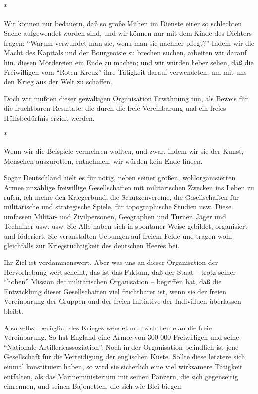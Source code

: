 \documentclass{scrbook}
\begin{document}
\begin{center}*\end{center}

Wir können nur bedauern, daß so große Mühen im Dienste einer so schlechten Sache aufgewendet worden sind, und wir können nur mit dem Kinde des Dichters fragen: ``Warum verwundet man sie, wenn man sie nachher pflegt?'' Indem wir die Macht des Kapitals und der Bourgeoisie zu brechen suchen, arbeiten wir darauf hin, diesen Mördereien ein Ende zu machen; und wir würden lieber sehen, daß die Freiwilligen vom ``Roten Kreuz'' ihre Tätigkeit darauf verwendeten, um mit uns den Krieg aus der Welt zu schaffen.

Doch wir mußten dieser gewaltigen Organisation Erwähnung tun, als Beweis für die fruchtbaren Resultate, die durch die freie Vereinbarung und ein freies Hülfsbedürfnis erzielt werden.

\begin{center}*\end{center}

Wenn wir die Beispiele vermehren wollten, und zwar, indem wir sie der Kunst, Menschen auszurotten, entnehmen, wir würden kein Ende finden.

Sogar Deutschland hielt es für nötig, neben seiner großen, wohlorganisierten Armee unzählige freiwillige Gesellschaften mit militärischen Zwecken ins Leben zu rufen, ich meine den Kriegerbund, die Schützenvereine, die Gesellschaften für militärische und strategische Spiele, für topographische Studien usw. Diese umfassen Militär- und Zivilpersonen, Geographen und Turner, Jäger und Techniker usw. usw. Sie Alle haben sich in spontaner Weise gebildet, organisiert und föderiert. Sie veranstalten Uebungen auf freiem Felde und tragen wohl gleichfalls zur Kriegstüchtigkeit des deutschen Heeres bei.

Ihr Ziel ist verdammenswert. Aber was uns an dieser Organisation der Hervorhebung wert scheint, das ist das Faktum, daß der Staat – trotz seiner ``hohen'' Mission der militärischen Organisation – begriffen hat, daß die Entwicklung dieser Gesellschaften viel fruchtbarer ist, wenn sie der freien Vereinbarung der Gruppen und der freien Initiative der Individuen überlassen bleibt.

Also selbst bezüglich des Krieges wendet man sich heute an die freie Vereinbarung. So hat England eine Armee von 300 000 Freiwilligen und seine ``Nationale Artillerieassoziation''. Noch in der Organisation befindlich ist jene Gesellschaft für die Verteidigung der englischen Küste. Sollte diese letztere sich einmal konstituiert haben, so wird sie sicherlich eine viel wirksamere Tätigkeit entfalten, als das Marineministerium mit seinen Panzern, die sich gegenseitig einrennen, und seinen Bajonetten, die sich wie Blei biegen.
\end{document}
